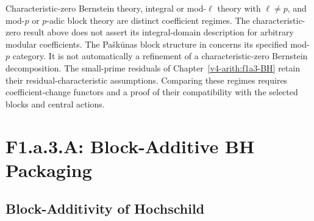 \begin{remark}
\label{v4-arith:w5-f:F1a3-AB:rem:coeff-regime}
Characteristic-zero Bernstein theory, integral or mod-$\ell$ theory
with $\ell\ne p$, and mod-$p$ or $p$-adic block theory are distinct
coefficient regimes. The characteristic-zero result above does not
assert its integral-domain description for arbitrary modular
coefficients. The Pa{\v s}k{\=u}nas block structure in
 concerns its
specified mod-$p$ category. It is not automatically a refinement
of a characteristic-zero Bernstein decomposition.
The small-prime residuals of Chapter~\ref{v4-arith:f1a3-BH}
retain their residual-characteristic assumptions. Comparing these
regimes requires coefficient-change functors and a proof of their
compatibility with the selected blocks and central actions.
\end{remark}

\section{F1.a.3.A: Block-Additive BH Packaging}
\label{v4-arith:w5-f:F1a3-AB:A-packaging}

\subsection{Block-Additivity of Hochschild}

